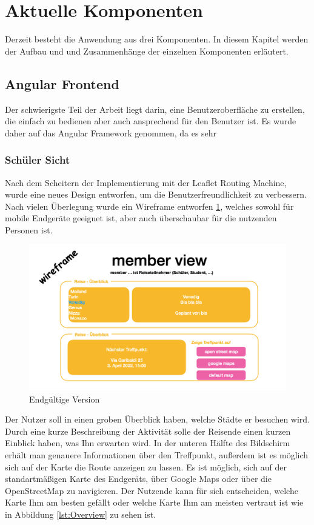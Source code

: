\section{Aktuelle Komponenten}
Derzeit besteht die Anwendung aus drei Komponenten. In diesem Kapitel werden der Aufbau und und Zusammenhänge der einzelnen Komponenten erläutert.  

\subsection{Angular Frontend}
Der schwierigste Teil der Arbeit liegt darin, eine Benutzeroberfläche zu erstellen, die einfach zu bedienen aber auch ansprechend für den Benutzer ist.
Es wurde daher auf das Angular Framework genommen, da es sehr 

\subsubsection{Schüler Sicht}

Nach dem Scheitern der Implementierung mit der Leaflet Routing Machine, wurde eine neues Design entworfen, um die Benutzerfreundlichkeit zu verbessern.
Nach vielen Überlegung wurde ein Wireframe entworfen \ref{lst:Wireframe}, welches sowohl für mobile Endgeräte geeignet ist, aber auch überschaubar für die nutzenden Personen ist.

\begin{figure}[h]
    \centering
    \includegraphics[scale=0.3]{pics/Wireframe.png}
    \caption{Endgültige Version }
    \label{lst:Wireframe}
\end{figure}


Der Nutzer soll in einen groben Überblick haben, welche Städte er besuchen wird. Durch eine kurze Beschreibung der Aktivität solle der Reisende einen kurzen Einblick haben, was Ihn erwarten wird. In der unteren Hälfte des Bildschirm erhält man genauere Informationen über den Treffpunkt, außerdem ist es möglich sich auf der Karte die Route anzeigen zu lassen. Es ist möglich, sich auf der standartmäßigen Karte des Endgeräts, über Google Maps oder über die OpenStreetMap zu navigieren. Der Nutzende kann für sich entscheiden, welche Karte Ihm am besten gefällt oder welche Karte Ihm am meisten vertraut ist wie in Abbildung \ref{lst:Overview} zu sehen ist.

